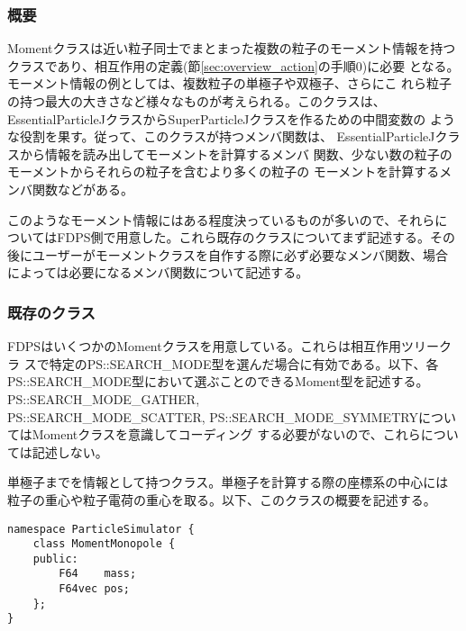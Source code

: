 \subsubsection{概要}

Momentクラスは近い粒子同士でまとまった複数の粒子のモーメント情報を持つ
クラスであり、相互作用の定義(節\ref{sec:overview_action}の手順0)に必要
となる。モーメント情報の例としては、複数粒子の単極子や双極子、さらにこ
れら粒子の持つ最大の大きさなど様々なものが考えられる。このクラスは、
EssentialParticleJクラスからSuperParticleJクラスを作るための中間変数の
ような役割を果す。従って、このクラスが持つメンバ関数は、
EssentialParticleJクラスから情報を読み出してモーメントを計算するメンバ
関数、少ない数の粒子のモーメントからそれらの粒子を含むより多くの粒子の
モーメントを計算するメンバ関数などがある。

このようなモーメント情報にはある程度決っているものが多いので、それらに
ついてはFDPS側で用意した。これら既存のクラスについてまず記述する。その
後にユーザーがモーメントクラスを自作する際に必ず必要なメンバ関数、場合
によっては必要になるメンバ関数について記述する。

\subsubsection{既存のクラス}


FDPSはいくつかのMomentクラスを用意している。これらは相互作用ツリークラ
スで特定のPS::SEARCH\_MODE型を選んだ場合に有効である。以下、各
PS::SEARCH\_MODE型において選ぶことのできるMoment型を記述する。
PS::SEARCH\_MODE\_GATHER, \\PS::SEARCH\_MODE\_SCATTER,
PS::SEARCH\_MODE\_SYMMETRYについてはMomentクラスを意識してコーディング
する必要がないので、これらについては記述しない。


\label{sec:MomentMonopole}

単極子までを情報として持つクラス。単極子を計算する際の座標系の中心には
粒子の重心や粒子電荷の重心を取る。以下、このクラスの概要を記述する。
\begin{screen}
\begin{verbatim}
namespace ParticleSimulator {
    class MomentMonopole {
    public:
        F64    mass;
        F64vec pos;
    };
}
\end{verbatim}
\end{screen}

